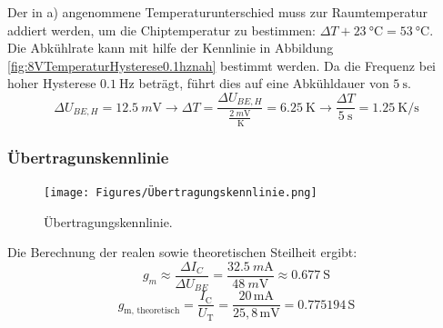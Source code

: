 \documentclass[
	a4paper, %
	12pt, %
]{CSUniSchoolLabReport}
\newcommand{\milli}{m}
\begin{document}
Der in a) angenommene Temperaturunterschied muss zur Raumtemperatur addiert werden, um die Chiptemperatur zu bestimmen: $\Delta T + \SI{23}{\degreeCelsius} = \SI{53}{\degreeCelsius}$.\\
Die Abkühlrate kann mit hilfe der Kennlinie in Abbildung \ref{fig:8VTemperaturHysterese0.1hznah} bestimmt werden.
Da die Frequenz bei hoher Hysterese $\SI{0.1}{\hertz}$ beträgt, führt dies auf eine Abkühldauer von $\SI{5}{\second}$.\\

\[
\Delta U_{BE,H} = \SI{12.5}{\milli\volt} \rightarrow \Delta T = \frac{\Delta U_{BE,H}}{\frac{\SI{2}{\milli\volt}}{\SI{}{\kelvin}}} = \SI{6.25}{\kelvin}
\rightarrow \frac{\Delta T}{\SI{5}{\second}} = \SI{1.25}{\kelvin\per\second}
\]
%


\subsubsection{Übertragunskennlinie}
\begin{figure}[H]
	\centering
	\texttt{[image: Figures/Übertragungskennlinie.png]}
	\caption{Übertragungskennlinie.}
	\label{fig:Übertragungskennlinie}
\end{figure}

Die Berechnung der realen sowie theoretischen Steilheit ergibt:\\

\[
g_m \approx \frac{\Delta I_C}{\Delta U_{BE}} = \frac{\SI{32.5}{\milli\ampere}}{\SI{48}{\milli\volt}} \approx \SI{0.677}{\siemens}
\]
\[
g_{\text{m, theoretisch}} = \frac{I_{\text{C}}}{U_{\text{T}}} = \frac{20\,\text{mA}}{25,8\,\text{mV}} = 0.775194\,\text{S}
\]
\end{document}
